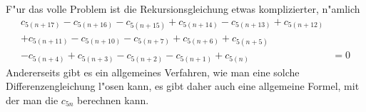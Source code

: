 F"ur das volle Problem ist die Rekursionsgleichung etwas komplizierter, n"amlich
\begin{align*}
c_{5(n+17)} %
-c_{5(n+16)} %
-c_{5(n+15)} %
+c_{5(n+14)} %
-c_{5(n+13)} %
+c_{5(n+12)} %
&
\\
+c_{5(n+11)} %
-c_{5(n+10)} %
-c_{5(n+7)} %
+c_{5(n+6)} %
+c_{5(n+5)} %
&
\\
-c_{5(n+4)} %
+c_{5(n+3)} %
-c_{5(n+2)} %
-c_{5(n+1)} %
+c_{5(n)} %
&=0
\end{align*}
Andererseits gibt es ein allgemeines Verfahren, wie man eine solche
Differenzengleichung l"osen kann, es gibt daher auch eine allgemeine
Formel, mit der man die $c_{5n}$ berechnen kann.




